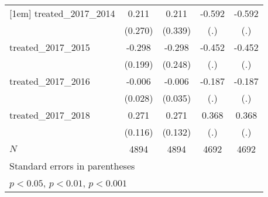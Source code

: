 {\begin{tabular}{l*{4}{c}}
[1em]
treated\_2017\_2014&       0.211         &       0.211         &      -0.592         &      -0.592         \\
            &     (0.270)         &     (0.339)         &         (.)         &         (.)         \\
[1em]
treated\_2017\_2015&      -0.298         &      -0.298         &      -0.452         &      -0.452         \\
            &     (0.199)         &     (0.248)         &         (.)         &         (.)         \\
[1em]
treated\_2017\_2016&      -0.006         &      -0.006         &      -0.187         &      -0.187         \\
            &     (0.028)         &     (0.035)         &         (.)         &         (.)         \\
[1em]
treated\_2017\_2018&       0.271\sym{*}  &       0.271\sym{*}  &       0.368         &       0.368         \\
            &     (0.116)         &     (0.132)         &         (.)         &         (.)         \\
\hline
\(N\)       &        4894         &        4894         &        4692         &        4692         \\
\hline\hline
\multicolumn{5}{l}{\footnotesize Standard errors in parentheses}\\
\multicolumn{5}{l}{\footnotesize \sym{*} \(p<0.05\), \sym{**} \(p<0.01\), \sym{***} \(p<0.001\)}\\
\end{tabular}
}
